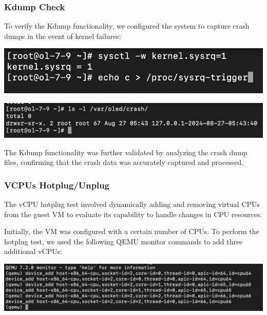 \subsubsection[Kdump Check]{Kdump Check}
To verify the Kdump functionality, we configured the system to capture crash dumps in the event of kernel failures:

\begin{center}
    \centering
    \includegraphics[width=\textwidth]{Images/Kdump Test 2.png}
    \label{fig}
\end{center}

\begin{center}
    \centering
    \includegraphics[width=\textwidth]{Images/Log Folder Founded.png}
    \label{fig}
\end{center}

The Kdump functionality was further validated by analyzing the crash dump files, confirming that the crash data was accurately captured and processed.

\subsubsection[VCPUs Hotplug/Unplug]{VCPUs Hotplug/Unplug}
The vCPU hotplug test involved dynamically adding and removing virtual CPUs from the guest VM to evaluate its capability to handle changes in CPU resources.\mynewline

Initially, the VM was configured with a certain number of CPUs. To perform the hotplug test, we used the following QEMU monitor commands to add three additional vCPUs:

\begin{center}
    \centering
    \includegraphics[width=\textwidth]{Images/Hotplug cpu.png}
    \label{fig}
\end{center}

